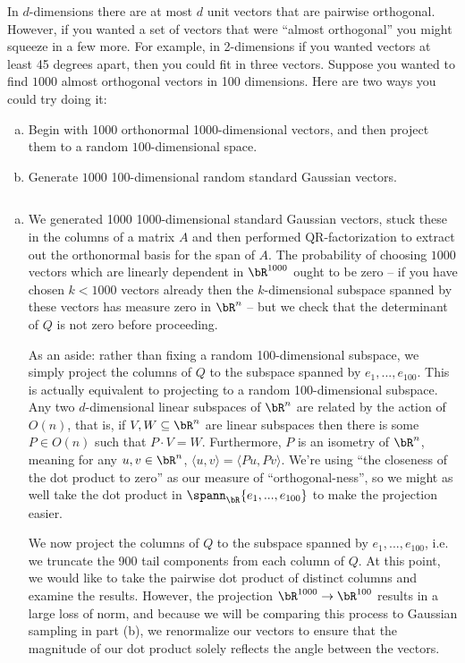 \begin{homework}[e]
  \prob In $d$-dimensions there are at most $d$ unit vectors that are pairwise orthogonal. However, if you wanted a set of vectors that were ``almost orthogonal'' you might squeeze in a few more. For example, in 2-dimensions if you wanted vectors at least 45 degrees apart, then you could fit in three vectors. Suppose you wanted to find $1000$ almost orthogonal vectors in 100 dimensions. Here are two ways you could try doing it:
  \begin{enumerate}[(a)]
    \item Begin with 1000 orthonormal 1000-dimensional vectors, and then project them to a random $100$-dimensional space.
    \item Generate $1000$ 100-dimensional random standard Gaussian vectors.
  \end{enumerate}
  \begin{soln}$ $
    \begin{enumerate}[(a)]
      \item We generated 1000 1000-dimensional standard Gaussian vectors, stuck these in the columns of a matrix $A$ and then performed QR-factorization to extract out the orthonormal basis for the span of $A$. The probability of choosing $1000$ vectors which are linearly dependent in $\bR^{1000}$ ought to be zero -- if you have chosen $k < 1000$ vectors already then the $k$-dimensional subspace spanned by these vectors has measure zero in $\bR^n$ -- but we check that the determinant of $Q$ is not zero before proceeding.

        As an aside: rather than fixing a random 100-dimensional subspace, we simply project the columns of $Q$ to the subspace spanned by $e_1,...,e_{100}$. This is actually equivalent to projecting to a random 100-dimensional subspace. Any two $d$-dimensional linear subspaces of $\bR^{n}$ are related by the action of $O(n)$, that is, if $V,W \subseteq \bR^n$ are linear subspaces then there is some $P \in O(n)$ such that $P \cdot V = W$. Furthermore, $P$ is an isometry of $\bR^n$, meaning for any $u,v \in \bR^n$, $\langle u,v \rangle = \langle Pu,Pv \rangle$. We're using ``the closeness of the dot product to zero'' as our measure of ``orthogonal-ness'', so we might as well take the dot product in $\spann_\bR\{e_1,...,e_{100}\}$ to make the projection easier.

        We now project the columns of $Q$ to the subspace spanned by $e_1,...,e_{100}$, i.e. we truncate the 900 tail components from each column of $Q$. At this point, we would like to take the pairwise dot product of distinct columns and examine the results. However, the projection $\bR^{1000} \to \bR^{100}$ results in a large loss of norm, and because we will be comparing this process to Gaussian sampling in part (b), we renormalize our vectors to ensure that the magnitude of our dot product solely reflects the angle between the vectors.


\end{enumerate}
\end{soln}
\end{homework}
